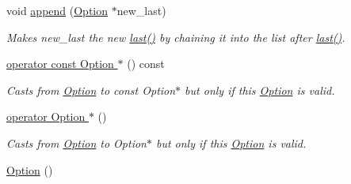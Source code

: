 \begin{DoxyCompactItemize}
void \hyperlink{classxmem_1_1config_1_1third__party_1_1_option_ac8fcf58435fb4e82ce937074af8198ac}{append} (\hyperlink{classxmem_1_1config_1_1third__party_1_1_option}{Option} $\ast$new\+\_\+last)
\begin{DoxyCompactList}\small\item\em Makes {\ttfamily new\+\_\+last} the new \hyperlink{classxmem_1_1config_1_1third__party_1_1_option_a79bd212eaf002df298da1b3b46e34cea}{last()} by chaining it into the list after \hyperlink{classxmem_1_1config_1_1third__party_1_1_option_a79bd212eaf002df298da1b3b46e34cea}{last()}. \end{DoxyCompactList}\item 
\hyperlink{classxmem_1_1config_1_1third__party_1_1_option_ae2be6cea552bb7b55fc4b264f5720911}{operator const Option $\ast$} () const 
\begin{DoxyCompactList}\small\item\em Casts from \hyperlink{classxmem_1_1config_1_1third__party_1_1_option}{Option} to const Option$\ast$ but only if this \hyperlink{classxmem_1_1config_1_1third__party_1_1_option}{Option} is valid. \end{DoxyCompactList}\item 
\hyperlink{classxmem_1_1config_1_1third__party_1_1_option_aca15f5c3126a45ea8e24dae817ebea7d}{operator Option $\ast$} ()
\begin{DoxyCompactList}\small\item\em Casts from \hyperlink{classxmem_1_1config_1_1third__party_1_1_option}{Option} to Option$\ast$ but only if this \hyperlink{classxmem_1_1config_1_1third__party_1_1_option}{Option} is valid. \end{DoxyCompactList}\item 
\hypertarget{classxmem_1_1config_1_1third__party_1_1_option_a49ea7c71e3f980214ad2ef4cca3c6662}{}\hyperlink{classxmem_1_1config_1_1third__party_1_1_option_a49ea7c71e3f980214ad2ef4cca3c6662}{Option} ()\label{classxmem_1_1config_1_1third__party_1_1_option_a49ea7c71e3f980214ad2ef4cca3c6662}


\end{DoxyCompactItemize}
